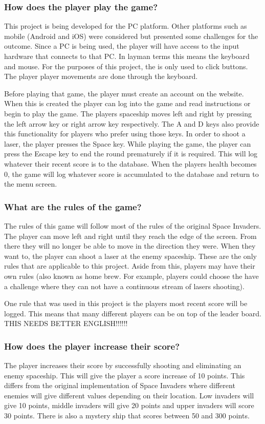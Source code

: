 \documentclass[12pt]{article}
\begin{document}
{\centering \subsubsection{How does the player play the game?}}
This project is being developed for the PC platform. Other platforms such as mobile (Android and iOS) were considered but presented some challenges for the outcome. Since a PC is being used, the player will have access to the input hardware that connects to that PC. In layman terms this means the keyboard and mouse. For the purposes of this project, the is only used to click buttons. The player player movements are done through the keyboard. 

Before playing that game, the player must create an account on the website. When this is created the player can log into the game and read instructions or begin to play the game. The players spaceship moves left and right by pressing the left arrow key or right arrow key respectively. The A and D keys also provide this functionality for players who prefer using those keys. In order to shoot a laser, the player presses the Space key. While playing the game, the player can press the Escape key to end the round prematurely if it is required. This will log whatever their recent score is to the database. When the players health becomes 0, the game will log whatever score is accumulated to the database and return to the menu screen.

{\centering \subsubsection{What are the rules of the game?}}
The rules of this game will follow most of the rules of the original Space Invaders. The player can move left and right until they reach the edge of the screen. From there they will no longer be able to move in the direction they were. When they want to, the player can shoot a laser at the enemy spaceship. These are the only rules that are applicable to this project. Aside from this, players may have their own rules (also known as home brew. For example, players could choose the have a challenge where they can not have a continuous stream of lasers shooting).

One rule that was used in this project is the players most recent score will be logged. This means that many different players can be on top of the leader board. THIS NEEDS BETTER ENGLISH!!!!!!

{\centering \subsubsection{How does the player increase their score?}}
The player increases their score by successfully shooting and eliminating an enemy spaceship. This will give the player a score increase of 10 points. This differs from the original implementation of Space Invaders where different enemies will give different values depending on their location. Low invaders will give 10 points, middle invaders will give 20 points and upper invaders will score 30 points. There is also a mystery ship that scores between 50 and 300 points.
\end{document}
